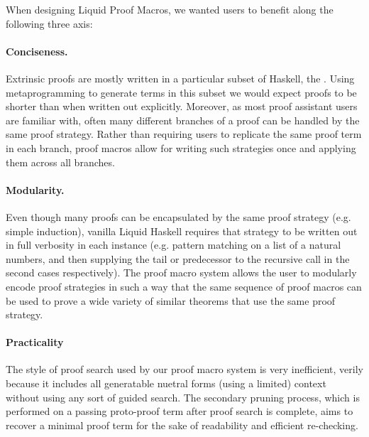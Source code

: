 

When designing Liquid Proof Macros, we wanted users to benefit along the following three axis:

\paragraph{Conciseness.}
%
Extrinsic proofs are mostly written in a particular subset of Haskell,
the \LangB. Using metaprogramming to generate terms in this subset we
would expect proofs to be shorter than when written out explicitly.
%
%
Moreover, as most proof assistant users are familiar with, often many
different branches of a proof can be handled by the same proof
strategy. Rather than requiring users to replicate the same proof term
in each branch, proof macros allow for writing such strategies once
and applying them across all branches.

\paragraph{Modularity.}
%
Even though many proofs can be encapsulated by the same proof strategy
(e.g. simple induction), vanilla Liquid Haskell requires that strategy
to be written out in full verbosity in each instance (e.g.  pattern
matching on a list of a natural numbers, and then supplying the tail
or predecessor to the recursive call in the second cases
respectively). The proof macro system allows the user to modularly
encode proof strategies in such a way that the same sequence of proof
macros can be used to prove a wide variety of similar theorems that
use the same proof strategy.

\paragraph{Practicality}
%
The style of proof search used by our proof macro system is very inefficient,
verily because it includes all generatable nuetral forms (using a limited)
context without using any sort of guided search. The secondary pruning process,
which is performed on a passing proto-proof term after proof search is complete,
aims to recover a minimal proof term for the sake of readability and efficient
re-checking.

